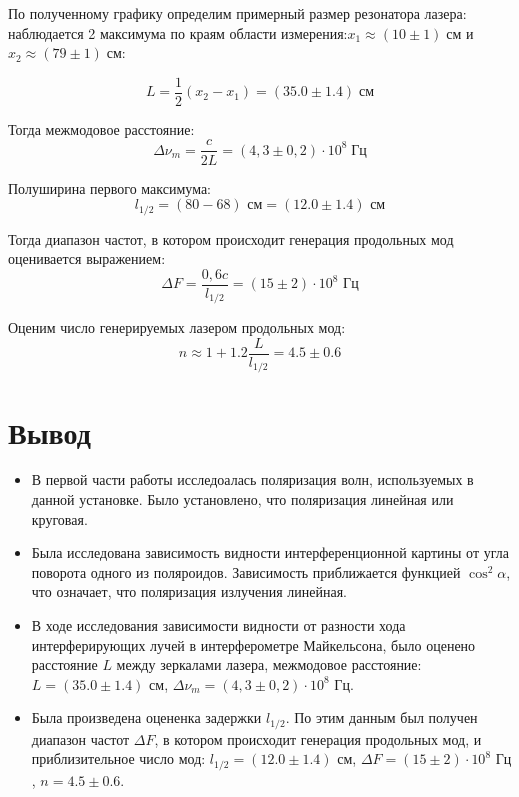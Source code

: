 \documentclass[a4paper,12pt]{article}
\begin{document}
По полученному графику определим примерный размер резонатора лазера:
наблюдается 2 максимума по краям области измерения:$ x_1 \approx (10 \pm 1) \; \text{см} $ и $ x_2 \approx (79 \pm 1) \; \text{см} $:

\begin{equation}\label{}
L = \dfrac{1}{2} (x_2 - x_1) = (35.0 \pm 1.4) \; \text{см}
\end{equation}

Тогда межмодовое расстояние:
\[ \Delta \nu_m = \dfrac{c}{2L} =  (4,3 \pm 0,2) \cdot 10^8 \; \text{Гц} \]

Полуширина первого максимума: 
\[ l_{1/2} = (80 - 68) \text{ см} = (12.0 \pm 1.4) \text{ см} \]

Тогда диапазон частот, в котором происходит генерация продольных мод оценивается выражением:
\[\Delta F = \frac{0,6c}{ l_{1/2}} = (15 \pm 2)\cdot 10^8 \text{ Гц} \]

Оценим число генерируемых лазером продольных мод:
\[ n \approx 1 + 1.2\dfrac{L}{l_{1/2}} = 4.5 \pm 0.6\]
\newpage
\section{Вывод}
\begin{itemize}
    \item В первой части работы исследоалась поляризация волн, используемых в данной установке. Было установлено, что поляризация линейная или круговая.
    \item Была исследована зависимость видности интерференционной картины от угла поворота одного из поляроидов. Зависимость приближается функцией $ \cos^2 \alpha $, что означает, что поляризация излучения линейная.
    \item В ходе исследования зависимости видности от разности хода интерферирующих лучей в интерферометре Майкельсона,  было оценено расстояние $ L $ между зеркалами лазера, межмодовое расстояние:
    $L = (35.0 \pm 1.4) \text{ см}$, 
    $\Delta\nu_m = (4,3 \pm 0,2) \cdot 10^8 \text{ Гц}$.
    \item Была произведена  оцененка задержки $ l_{1/2} $. По этим данным был получен диапазон частот $ \Delta F $, в котором происходит генерация продольных мод, и приблизительное число мод:
    $ l_{1/2} = (12.0 \pm 1.4) \text{ см}$, 
    $\Delta F = (15 \pm 2)\cdot 10^8 \text{ Гц}$, 
    $n = 4.5 \pm 0.6$.
\end{itemize}
\end{document}
